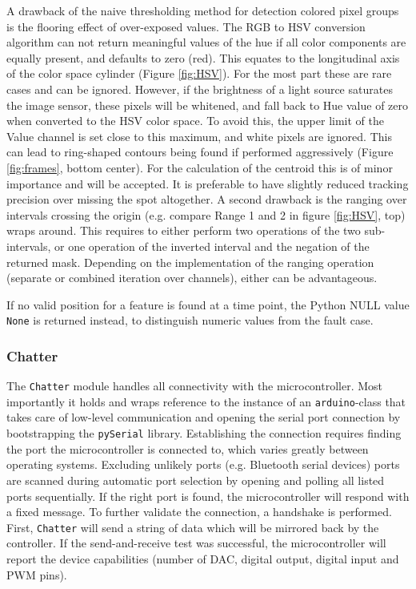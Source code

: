 A drawback of the naive thresholding method for detection colored pixel groups is the flooring effect of over-exposed values. The RGB to HSV conversion algorithm can not return meaningful values of the hue if all color components are equally present, and defaults to zero (red). This equates to the longitudinal axis of the color space cylinder (Figure \ref{fig:HSV}). For the most part these are rare cases and can be ignored. However, if the brightness of a light source saturates the image sensor, these pixels will be whitened, and fall back to Hue value of zero when converted to the HSV color space. To avoid this, the upper limit of the Value channel is set close to this maximum, and white pixels are ignored. This can lead to ring-shaped contours being found if performed aggressively (Figure \ref{fig:frames}, bottom center). For the calculation of the centroid this is of minor importance and will be accepted. It is preferable to have slightly reduced tracking precision over missing the spot altogether. A second drawback is the ranging over intervals crossing the origin (e.g. compare Range 1 and 2 in figure \ref{fig:HSV}, top) wraps around. This requires to either perform two operations of the two sub-intervals, or one operation of the inverted interval and the negation of the returned mask. Depending on the implementation of the ranging operation (separate or combined iteration over channels), either can be advantageous.

If no valid position for a feature is found at a time point, the Python NULL value \texttt{None} is returned instead, to distinguish numeric values from the fault case.

\subsubsection{Chatter}
\label{sec:Chatter}

The \texttt{Chatter} module handles all connectivity with the microcontroller. Most importantly it holds and wraps reference to the instance of an \texttt{arduino}-class that takes care of low-level communication and opening the serial port connection by bootstrapping the \texttt{pySerial} library. Establishing the connection requires finding the port the microcontroller is connected to, which varies greatly between operating systems. Excluding unlikely ports (e.g. Bluetooth serial devices) ports are scanned during automatic port selection by opening and polling all listed ports sequentially. If the right port is found, the microcontroller will respond with a fixed message. To further validate the connection, a handshake is performed. First, \texttt{Chatter} will send a string of data which will be mirrored back by the controller. If the send-and-receive test was successful, the microcontroller will report the device capabilities (number of DAC, digital output, digital input and PWM pins).

